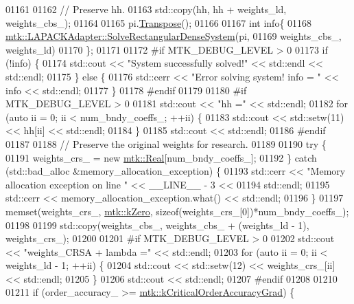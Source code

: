 \begin{DoxyCode}
{{01161 
01162   \textcolor{comment}{// Preserve hh.}
01163   std::copy(hh, hh + weights\_ld, weights\_cbs\_);
01164 
01165   pi.\hyperlink{classmtk_1_1DenseMatrix_a71d9c07ca66e88d97d1fd5012f43138b}{Transpose}();
01166 
01167   \textcolor{keywordtype}{int} info\{
01168     \hyperlink{classmtk_1_1LAPACKAdapter_a380f148ffdf96bae2f79ae28f1a6560c}{mtk::LAPACKAdapter::SolveRectangularDenseSystem}(pi,
01169                                                     weights\_cbs\_, weights\_ld)
01170   \};
01171 
01172 \textcolor{preprocessor}{  #if MTK\_DEBUG\_LEVEL > 0}
01173   \textcolor{keywordflow}{if} (!info) \{
01174     std::cout << \textcolor{stringliteral}{"System successfully solved!"} << std::endl << std::endl;
01175   \} \textcolor{keywordflow}{else} \{
01176     std::cerr << \textcolor{stringliteral}{"Error solving system! info = "} << info << std::endl;
01177   \}
01178 \textcolor{preprocessor}{  #endif}
01179 
01180 \textcolor{preprocessor}{  #if MTK\_DEBUG\_LEVEL > 0}
01181   std::cout << \textcolor{stringliteral}{"hh ="} << std::endl;
01182   \textcolor{keywordflow}{for} (\textcolor{keyword}{auto} ii = 0; ii < num\_bndy\_coeffs\_; ++ii) \{
01183     std::cout << std::setw(11) << hh[ii] << std::endl;
01184   \}
01185   std::cout << std::endl;
01186 \textcolor{preprocessor}{  #endif}
01187 
01188   \textcolor{comment}{// Preserve the original weights for research.}
01189 
01190   \textcolor{keywordflow}{try} \{
01191     weights\_crs\_ = \textcolor{keyword}{new} \hyperlink{group__c01-roots_gac080bbbf5cbb5502c9f00405f894857d}{mtk::Real}[num\_bndy\_coeffs\_];
01192   \} \textcolor{keywordflow}{catch} (std::bad\_alloc &memory\_allocation\_exception) \{
01193     std::cerr << \textcolor{stringliteral}{"Memory allocation exception on line "} << \_\_LINE\_\_ - 3 <<
01194       std::endl;
01195     std::cerr << memory\_allocation\_exception.what() << std::endl;
01196   \}
01197   memset(weights\_crs\_, \hyperlink{group__c01-roots_ga59a451a5fae30d59649bcda274fea271}{mtk::kZero}, \textcolor{keyword}{sizeof}(weights\_crs\_[0])*num\_bndy\_coeffs\_);
01198 
01199   std::copy(weights\_cbs\_, weights\_cbs\_ + (weights\_ld - 1), weights\_crs\_);
01200 
01201 \textcolor{preprocessor}{  #if MTK\_DEBUG\_LEVEL > 0}
01202   std::cout << \textcolor{stringliteral}{"weights\_CRSA + lambda ="} << std::endl;
01203   \textcolor{keywordflow}{for} (\textcolor{keyword}{auto} ii = 0; ii < weights\_ld - 1; ++ii) \{
01204     std::cout << std::setw(12) << weights\_crs\_[ii] << std::endl;
01205   \}
01206   std::cout << std::endl;
01207 \textcolor{preprocessor}{  #endif}
01208 
01210 
01211   \textcolor{keywordflow}{if} (order\_accuracy\_ >= \hyperlink{group__c01-roots_ga295dd2f403c775ecd942c22b5a777496}{mtk::kCriticalOrderAccuracyGrad}) \{
}}
\end{DoxyCode}
